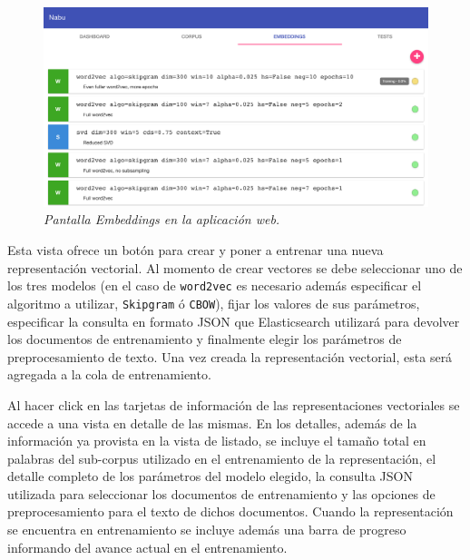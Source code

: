 \begin{figure}[h]
    \centering
    \includegraphics[width=\textwidth]{images/ui-nabu-embeddings}
    \caption{\textit{Pantalla Embeddings en la aplicación web.}}
    \label{fig:ui-nabu-embeddings}
\end{figure}

Esta vista ofrece un botón para crear y poner a entrenar una nueva representación vectorial. Al momento de
crear vectores se debe seleccionar uno de los tres modelos (en el caso de \texttt{word2vec} es necesario además
especificar el algoritmo a utilizar, \texttt{Skipgram} ó \texttt{CBOW}), fijar los valores de sus parámetros,
especificar la consulta en formato JSON que Elasticsearch utilizará para devolver los documentos de
entrenamiento y finalmente elegir los parámetros de preprocesamiento de texto. Una vez creada la representación
vectorial, esta será agregada a la cola de entrenamiento.

Al hacer click en las tarjetas de información de las representaciones vectoriales se accede a una vista en
detalle de las mismas. En los detalles, además de la información ya provista en la vista de listado, se incluye
el tamaño total en palabras del sub-corpus utilizado en el entrenamiento de la representación, el detalle
completo de los parámetros del modelo elegido, la consulta JSON utilizada para seleccionar los documentos de
entrenamiento y las opciones de preprocesamiento para el texto de dichos documentos. Cuando la representación
se encuentra en entrenamiento se incluye además una barra de progreso informando del avance actual en el
entrenamiento.

